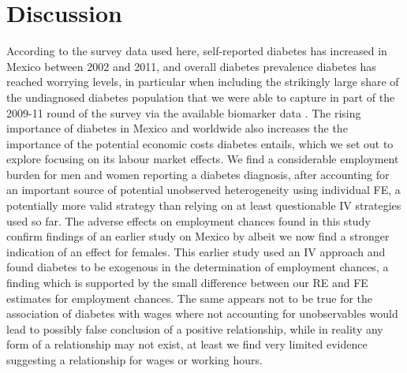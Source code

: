 \section{\noindent \label{sec:Conclusion}Discussion}

According to the survey data used here, self-reported diabetes has increased in Mexico between 2002 and 2011, and overall
diabetes prevalence diabetes has reached worrying
levels, in particular when including the strikingly large share of the undiagnosed diabetes population that we were able to capture in part of the 2009-11 round of the survey via the available biomarker data \citep{Frankenberg2015}. The rising importance of diabetes in Mexico and worldwide also increases the the importance of the potential economic costs diabetes entails, which we set out to explore focusing on its labour market effects. We find a considerable employment burden for men and women reporting a diabetes diagnosis, after accounting for an important source of potential unobserved heterogeneity using individual \ac{FE}, a potentially more valid strategy than relying on at least questionable \ac{IV} strategies used so far. The adverse effects on employment chances found in this study confirm findings of an earlier study on Mexico by \cite{Seuring2015} albeit we now find a stronger indication of an effect for females. This earlier study used an \ac{IV} approach and found diabetes to be exogenous in the determination of employment chances, a finding which is supported by the small difference between our \ac{RE} and \ac{FE} estimates for employment chances. The same appears not to be true for the association of diabetes with wages where not accounting for unobservables would lead to possibly false conclusion of a positive relationship, while in reality any form of a relationship may not exist, at least we find very limited evidence suggesting a relationship for wages or working hours.

